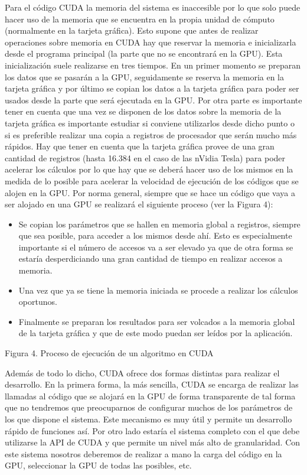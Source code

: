 Para el código CUDA la memoria del sistema es inaccesible por lo que solo puede hacer uso de la memoria que se encuentra en la propia unidad de cómputo (normalmente en la tarjeta gráfica). Esto supone que antes de realizar operaciones sobre memoria en CUDA hay que reservar la memoria e inicializarla desde el programa principal (la parte que no se encontrará en la GPU). Esta inicialización suele realizarse en tres tiempos. En un primer momento se preparan los datos que se pasarán a la GPU, seguidamente se reserva la memoria en la tarjeta gráfica y por último se copian los datos a la tarjeta gráfica para poder ser usados desde la parte que será ejecutada en la GPU.
Por otra parte es importante tener en cuenta que una vez se disponen de los datos sobre la memoria de la tarjeta gráfica es importante estudiar si conviene utilizarlos desde dicho punto o si es preferible realizar una copia a registros de procesador que serán mucho más rápidos. Hay que tener en cuenta que la tarjeta gráfica provee de una gran cantidad de registros (hasta 16.384 en el caso de las nVidia Tesla) para poder acelerar los cálculos por lo que hay que se deberá hacer uso de los mismos en la medida de lo posible para acelerar la velocidad de ejecución de los códigos que se alojen en la GPU.
Por norma general, siempre que se hace un código que vaya a ser alojado en una GPU se realizará el siguiente proceso (ver la Figura 4):

\begin{itemize}
	\item Se copian los parámetros que se hallen en memoria global a registros, siempre que sea posible, para acceder a los mismos desde ahí. Esto es especialmente importante si el número de accesos va a ser elevado ya que de otra forma se estaría desperdiciando una gran cantidad de tiempo en realizar accesos a memoria.
	\item Una vez que ya se tiene la memoria iniciada se procede a realizar los cálculos oportunos.
	\item Finalmente se preparan los resultados para ser volcados a la memoria global de la tarjeta gráfica y que de este modo puedan ser leídos por la aplicación.
\end{itemize}
 
Figura 4. Proceso de ejecución de un algoritmo en CUDA

Además de todo lo dicho, CUDA ofrece dos formas distintas para realizar el desarrollo. En la primera forma, la más sencilla, CUDA se encarga de realizar las llamadas al código que se alojará en la GPU de forma transparente de tal forma que no tendremos que preocuparnos de configurar muchos de los parámetros de los que dispone el sistema. Este mecanismo es muy útil y permite un desarrollo rápido de funciones así. Por otro lado estaría el sistema completo con el que debe utilizarse la API de CUDA y que permite un nivel más alto de granularidad. Con este sistema nosotros deberemos de realizar a mano la carga del código en la GPU, seleccionar la GPU de todas las posibles, etc.

